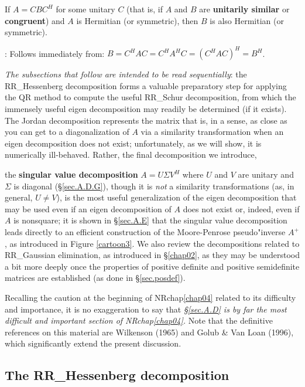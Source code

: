 \begin{fact} \label{fact.A.D.B}
If $A=CBC^{H}$ for some unitary $C$ (that is,
if $A$ and $B$ are {\bf unitarily similar} or {\bf congruent}) and $A$ is Hermitian (or
symmetric), then $B$ is also Hermitian (or symmetric).
\end{fact}

\/: Follows immediately from:
$B=C^{H}A C=C^{H}A^{H} C=(C^{H}A C)^{H}=B^{H}$. \endproof \medskip

{\it The subsections that follow are intended to be read sequentially}: the RR_Hessenberg
decomposition forms a valuable preparatory step for applying the QR
method to compute the useful RR_Schur decomposition, from which the immensely useful
eigen decomposition may readily be determined (if it exists).  The Jordan decomposition
represents the matrix that is, in a sense, as close as you can get to a diagonalization of $A$
via a similarity transformation when an eigen decomposition does not exist; unfortunately, as we will
show, it is numerically ill-behaved.  Rather, the final decomposition we introduce, 
\beginmylistb
\item the {\bf singular value decomposition} $A=U \Sigma V^H$ where $U$ and $V$ are unitary and $\Sigma$ is diagonal (\S \ref{sec.A.D.G}),
\endmylist
though it is {\it not} a similarity transformations (as, in general, $U\ne V$), is the most useful
generalization of the eigen decomposition that may be used even
if an eigen decomposition of $A$ does not exist or, indeed, even if $A$ is nonsquare;
it is shown in \S \ref{sec.A.E} that the singular value decomposition leads directly
to an efficient construction of the Moore-Penrose pseudo"inverse $A^+$, as introduced in Figure \ref{cartoon3}.
We also review the decompositions related to RR_Gaussian elimination, as introduced in \S \ref{chap02}, as they may
be understood a bit more deeply once the properties of positive definite and positive semidefinite
matrices are established (as done in \S \ref{sec.posdef}).  

Recalling the caution at the beginning of NRchap\ref{chap04} related to its difficulty and importance, it is no exaggeration to say that
{\it \S \ref{sec.A.D} is by far the most difficult and important section of NRchap\ref{chap04}.}  Note that the definitive references on this material
are Wilkenson (1965) and Golub \& Van Loan (1996), which significantly extend the present discussion.

\clearpage

\subsection{The RR_Hessenberg decomposition}\label{sec.A.D.A}

